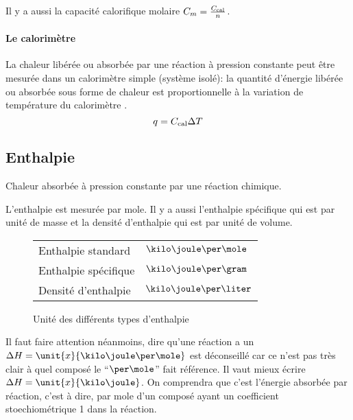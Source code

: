 Il y a aussi la capacité calorifique molaire $C_m = \frac{C_\mathrm{cal}}{n}$.


\paragraph{Le calorimètre}
La chaleur libérée ou absorbée par une réaction à pression constante peut être mesurée dans un calorimètre simple (système isolé): la quantité d'énergie libérée ou absorbée sous forme de chaleur est proportionnelle à la variation de température du calorimètre \cite[pp.~16,17]{legras}.
$$q=C_\mathrm{cal} \Delta T$$

\subsection{Enthalpie} \label{sec:DH}
Chaleur absorbée à pression constante par une réaction chimique.

L'enthalpie est mesurée par mole.
Il y a aussi l'enthalpie spécifique qui est par unité de masse et la densité d'enthalpie qui est par unité de volume.

\begin{figure}[h!]
	\begin{center}
		\begin{tabular}{|ll|}
			\hline
			Enthalpie standard & $\kilo\joule\per\mole$\\
			Enthalpie spécifique & $\kilo\joule\per\gram$\\
			Densité d'enthalpie & $\kilo\joule\per\liter$\\
			\hline
		\end{tabular}
	\end{center}
	\label{fig:enthunit}
	\caption{Unité des différents types d'enthalpie}
\end{figure}

Il faut faire attention néanmoins, dire qu'une réaction a un $\Delta H = \unit{x}{\kilo\joule\per\mole}$ est déconseillé car ce n'est pas très clair à quel composé le ``$\per\mole$'' fait référence.
Il vaut mieux écrire $\Delta H = \unit{x}{\kilo\joule}$.
On comprendra que c'est l'énergie absorbée par réaction, c'est à dire, par mole d'un composé ayant un coefficient stoechiométrique 1 dans la réaction.

